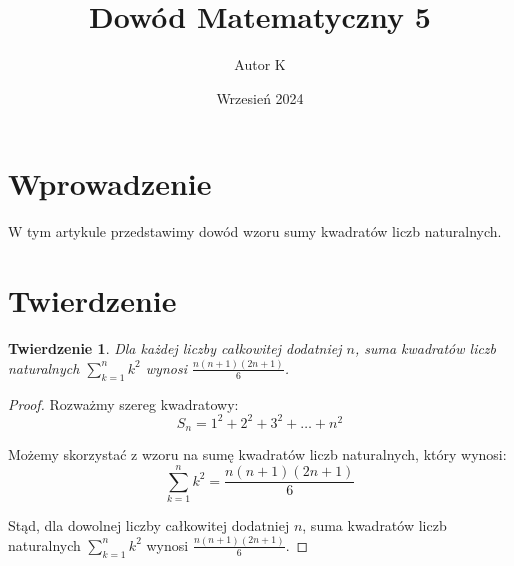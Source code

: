 \documentclass{article}
\title{Dowód Matematyczny 5}
\author{Autor K}
\date{Wrzesień 2024}
\theoremstyle{plain}
\newtheorem{theorem}{Twierdzenie}
\begin{document}
\maketitle

\section{Wprowadzenie}

W tym artykule przedstawimy dowód wzoru sumy kwadratów liczb naturalnych.

\section{Twierdzenie}

\begin{theorem}
Dla każdej liczby całkowitej dodatniej $n$, suma kwadratów liczb naturalnych $\sum_{k=1}^{n} k^2$ wynosi $\frac{n(n+1)(2n+1)}{6}$.
\end{theorem}

\begin{proof}
Rozważmy szereg kwadratowy:
\[ S_n = 1^2 + 2^2 + 3^2 + \ldots + n^2 \]

Możemy skorzystać z wzoru na sumę kwadratów liczb naturalnych, który wynosi:
\[ \sum_{k=1}^{n} k^2 = \frac{n(n+1)(2n+1)}{6} \]

Stąd, dla dowolnej liczby całkowitej dodatniej $n$, suma kwadratów liczb naturalnych $\sum_{k=1}^{n} k^2$ wynosi $\frac{n(n+1)(2n+1)}{6}$.
\end{proof}
\end{document}
